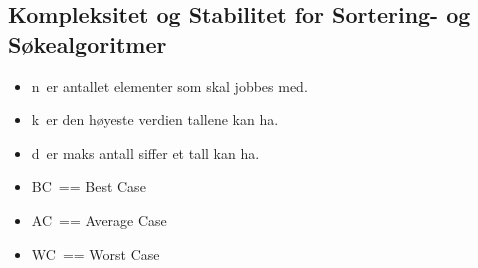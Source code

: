 \documentclass[12pt]{report}
\begin{document}
\vspace{\baselineskip}



\newpage

\vspace{\baselineskip}\subsection*{Kompleksitet og Stabilitet for Sortering- og Søkealgoritmer}
\begin{itemize}
	\item n er antallet elementer som skal jobbes med.\par

	\item k er den høyeste verdien tallene kan ha.\par

	\item d er maks antall siffer et tall kan ha.\par

	\item BC == Best Case\par

	\item AC == Average Case\par

	\item WC == Worst Case
\end{itemize}\par


\vspace{\baselineskip}


\end{document}
